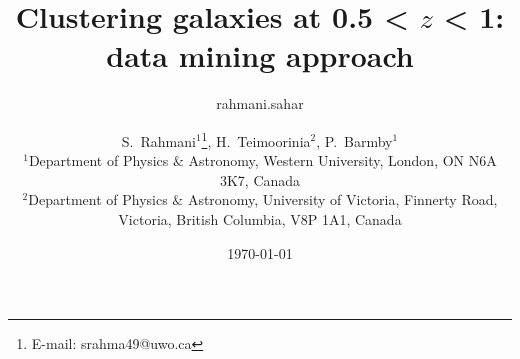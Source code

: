 \documentclass[useAMS,usenatbib]{mn2e}
\begin{document}

\title[SOM: classifying high $Z$ galaxies]{Clustering galaxies at 0.5 < $z$ < 1: data mining approach}
\author{rahmani.sahar }
\date{\today}
\author[S.~Rahmani, H.~Teimoorinia and P.~Barmby]{S.~Rahmani$^{1}$\thanks{E-mail:
srahma49@uwo.ca}, H.~Teimoorinia$^{2}$, P.~Barmby$^{1}$\\
$^{1}$Department of Physics $\&$ Astronomy, Western University, London, ON N6A 3K7, Canada\\
$^{2}$Department of Physics $\&$ Astronomy, University of Victoria, Finnerty Road, Victoria, British Columbia, V8P 1A1, Canada}
\maketitle

\end{document}
